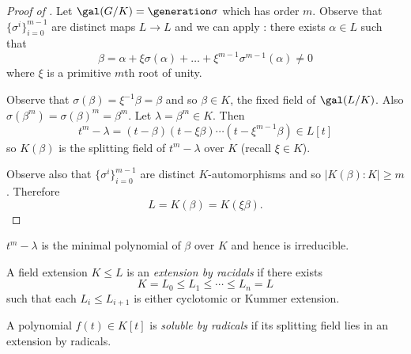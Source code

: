 \documentclass[a4paper]{article}
\begin{document}
\begin{proof}[Proof of ]
  Let \(\gal(G/K) = \generation \sigma\) which has order \(m\). Observe that \(\{\sigma^i\}_{i = 0}^{m - 1}\) are distinct maps \(L \to L\) and we can apply : there exists \(\alpha \in L\) such that
  \[
    \beta = \alpha + \xi \sigma(\alpha) + \dots + \xi^{m - 1} \sigma^{m - 1}(\alpha) \neq 0
  \]
  where \(\xi\) is a primitive \(m\)th root of unity.

  Observe that \(\sigma(\beta) = \xi^{-1} \beta = \beta\) and so \(\beta \in K\), the fixed field of \(\gal(L/K)\). Also \(\sigma(\beta^m) = \sigma(\beta)^m = \beta^m\). Let \(\lambda = \beta^m \in K\). Then
  \[
    t^m - \lambda = (t - \beta)(t - \xi\beta)\cdots(t - \xi^{m - 1}\beta) \in L[t]
  \]
  so \(K(\beta)\) is the splitting field of \(t^m - \lambda\) over \(K\) (recall \(\xi \in K\)).

  Observe also that \(\{\sigma^i\}_{i = 0}^{m - 1}\) are distinct \(K\)-automorphisms and so \(|K(\beta):K| \geq m\). Therefore
  \[
    L = K(\beta) = K(\xi\beta).
  \]
\end{proof}

\(t^m - \lambda\) is the minimal polynomial of \(\beta\) over \(K\) and hence is irreducible.

\begin{definition}
  A field extension \(K \leq L\) is an \emph{extension by racidals} if there exists
  \[
    K = L_0 \leq L_ 1 \leq \cdots \leq L_n = L
  \]
  such that each \(L_i \leq L_{i + 1}\) is either cyclotomic or Kummer extension.
\end{definition}

\begin{definition}
  A polynomial \(f(t) \in K[t]\) is \emph{soluble by radicals} if its splitting field lies in an extension by radicals.
\end{definition}
\end{document}
